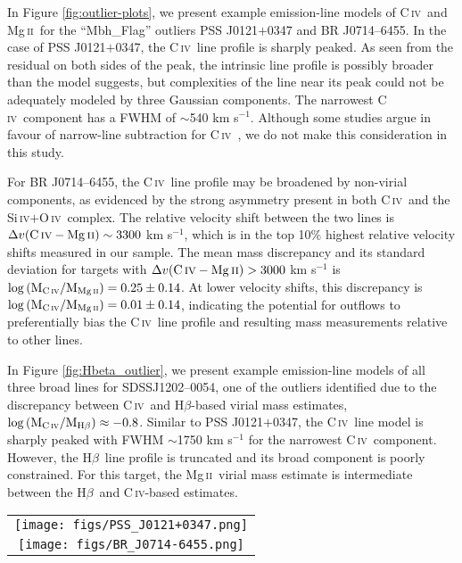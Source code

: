 \documentclass[fleqn,usenatbib]{mnras}
\newcommand{\mgii}{Mg\,\textsc{ii}}
\newcommand{\civ}{C\,\textsc{iv}}
\newcommand{\siiv}{Si\,\textsc{iv}}
\newcommand{\oiv}{O\,\textsc{iv}}
\newcommand{\hbeta}{H\textsc{$\beta$}}
\begin{document}
In Figure \ref{fig:outlier-plots}, we present example emission-line models of \civ\ and \mgii\ for the ``Mbh\_Flag'' outliers PSS J0121$+$0347 and BR J0714--6455. In the case of PSS J0121$+$0347, the \civ\ line profile is sharply peaked. As seen from the residual on both sides of the peak, the intrinsic line profile is possibly broader than the model suggests, but complexities of the line near its peak could not be adequately modeled by three Gaussian components. The narrowest \civ\ component has a FWHM of $\sim$540 km s$^{-1}$. Although some studies argue in favour of narrow-line subtraction for \civ\ \citep{baskin_laor_2005}, we do not make this consideration in this study.

For BR J0714--6455, the \civ\ line profile may be broadened by non-virial components, as evidenced by the strong asymmetry present in both \civ\ and the \siiv$+$\oiv\ complex. The relative velocity shift between the two lines is $\Delta v(\rm{\civ-\mgii}) \sim 3300$ km s$^{-1}$, which is in the top 10\% highest relative velocity shifts measured in our sample. The mean mass discrepancy and its standard deviation for targets with $\Delta v(\rm{\civ-\mgii}) > 3000$ km s$^{-1}$ is $\log\left(\rm{M_{\civ}}/\rm{M_{\mgii}}\right) = 0.25 \pm 0.14$. At lower velocity shifts, this discrepancy is $\log\left(\rm{M_{\civ}}/\rm{M_{\mgii}}\right) = 0.01 \pm 0.14$, indicating the potential for outflows to preferentially bias the \civ\ line profile and resulting mass measurements relative to other lines.

In Figure \ref{fig:Hbeta_outlier}, we present example emission-line models of all three broad lines for SDSSJ1202--0054, one of the outliers identified due to the discrepancy between \civ\ and \hbeta-based virial mass estimates, $\log\left(\rm{M_{\civ}}/\rm{M_{\hbeta}}\right) \approx -0.8$. Similar to PSS J0121$+$0347, the \civ\ line model is sharply peaked with FWHM $\sim$1750 km s$^{-1}$ for the narrowest \civ\ component. However, the \hbeta\ line profile is truncated and its broad component is poorly constrained. For this target, the \mgii\ virial mass estimate is intermediate between the \hbeta\ and \civ-based estimates.


\begin{figure*}
\begin{tabular}{c}
  \texttt{[image: figs/PSS\_J0121+0347.png]} \\   
  \texttt{[image: figs/BR\_J0714-6455.png]} 
\end{tabular}
\caption{Example models of the \civ\ and \mgii\ emission-lines from PSS J0121$+$0347 and BR J0714--6455, outliers identified by the ``Mbh\_Flag'' which indicates when the \mgii-based virial mass estimate differs from the mean mass estimated from all measured emission-lines by over 0.3 dex. Refer to Figure \ref{fig:Example_fits} for a description of the plotted elements.} 
\label{fig:outlier-plots}
\end{figure*}
\end{document}
